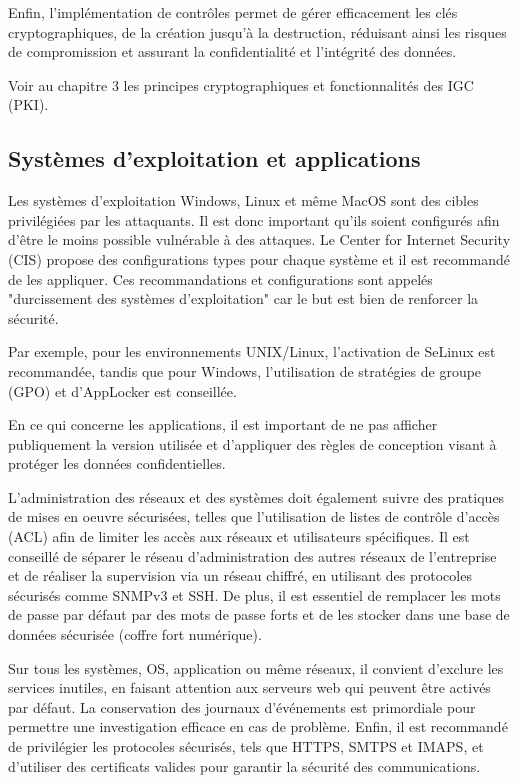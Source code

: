 Enfin, l'implémentation de contrôles permet de gérer efficacement les clés cryptographiques, de la création jusqu'à la destruction, réduisant ainsi les risques de compromission et assurant la confidentialité et l'intégrité des données.

Voir au chapitre 3 les principes cryptographiques et fonctionnalités des IGC (PKI).

\subsection{Systèmes d'exploitation et applications}

Les systèmes d'exploitation Windows, Linux et même MacOS sont des cibles privilégiées par les attaquants. Il est donc important qu'ils soient configurés afin d'être le moins possible vulnérable à des attaques. Le Center for Internet Security (CIS) propose des configurations types pour chaque système et il est recommandé de les appliquer. Ces recommandations et configurations sont appelés "durcissement des systèmes d'exploitation" car le but est bien de renforcer la sécurité.

Par exemple, pour les environnements UNIX/Linux, l'activation de SeLinux est recommandée, tandis que pour Windows, l'utilisation de stratégies de groupe (GPO) et d'AppLocker est conseillée. 

En ce qui concerne les applications, il est important de ne pas afficher publiquement la version utilisée et d'appliquer des règles de conception visant à protéger les données confidentielles.

L'administration des réseaux et des systèmes doit également suivre des pratiques de mises en oeuvre sécurisées, telles que l'utilisation de listes de contrôle d'accès (ACL) afin de limiter les accès aux réseaux et utilisateurs spécifiques. Il est conseillé de séparer le réseau d'administration des autres réseaux de l'entreprise et de réaliser la supervision via un réseau chiffré, en utilisant des protocoles sécurisés comme SNMPv3 et SSH. De plus, il est essentiel de remplacer les mots de passe par défaut par des mots de passe forts et de les stocker dans une base de données sécurisée (coffre fort numérique).

Sur tous les systèmes, OS, application ou même réseaux, il convient d'exclure les services inutiles, en faisant attention aux serveurs web qui peuvent être activés par défaut. La conservation des journaux d'événements est primordiale pour permettre une investigation efficace en cas de problème. Enfin, il est recommandé de privilégier les protocoles sécurisés, tels que HTTPS, SMTPS et IMAPS, et d'utiliser des certificats valides pour garantir la sécurité des communications.


